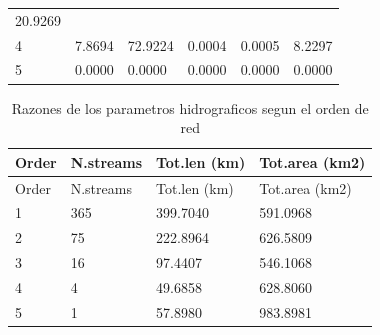 \documentclass[11pt,]{article}
\begin{document}
\begin{longtable}[]{@{}llllll@{}}
\begin{minipage}[t]{0.15\columnwidth}
20.9269\strut
\end{minipage}\tabularnewline
\begin{minipage}[t]{0.13\columnwidth}\raggedright\strut
4\strut
\end{minipage} & \begin{minipage}[t]{0.13\columnwidth}\raggedright\strut
7.8694\strut
\end{minipage} & \begin{minipage}[t]{0.13\columnwidth}\raggedright\strut
72.9224\strut
\end{minipage} & \begin{minipage}[t]{0.13\columnwidth}\raggedright\strut
0.0004\strut
\end{minipage} & \begin{minipage}[t]{0.15\columnwidth}\raggedright\strut
0.0005\strut
\end{minipage} & \begin{minipage}[t]{0.15\columnwidth}\raggedright\strut
8.2297\strut
\end{minipage}\tabularnewline
\begin{minipage}[t]{0.13\columnwidth}\raggedright\strut
5\strut
\end{minipage} & \begin{minipage}[t]{0.13\columnwidth}\raggedright\strut
0.0000\strut
\end{minipage} & \begin{minipage}[t]{0.13\columnwidth}\raggedright\strut
0.0000\strut
\end{minipage} & \begin{minipage}[t]{0.13\columnwidth}\raggedright\strut
0.0000\strut
\end{minipage} & \begin{minipage}[t]{0.15\columnwidth}\raggedright\strut
0.0000\strut
\end{minipage} & \begin{minipage}[t]{0.15\columnwidth}\raggedright\strut
0.0000\strut
\end{minipage}\tabularnewline
\bottomrule
\end{longtable}

\begin{longtable}[]{@{}llll@{}}
\caption{\label{tablaseis}Razones de los parametros hidrograficos segun
el orden de red}\tabularnewline
\toprule
Order & N.streams & Tot.len (km) & Tot.area (km2)\tabularnewline
\midrule
\endfirsthead
\toprule
Order & N.streams & Tot.len (km) & Tot.area (km2)\tabularnewline
\midrule
\endhead
1 & 365 & 399.7040 & 591.0968\tabularnewline
2 & 75 & 222.8964 & 626.5809\tabularnewline
3 & 16 & 97.4407 & 546.1068\tabularnewline
4 & 4 & 49.6858 & 628.8060\tabularnewline
5 & 1 & 57.8980 & 983.8981\tabularnewline
\bottomrule
\end{longtable}
\end{document}
